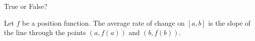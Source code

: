 \documentclass{ximera}
\author{Gregory Hartman \and Matthew Carr}
\begin{document}
\begin{exercise}




True or False?
\begin{center}
Let $f$ be a position function. The average rate of change on $[a,b]$ is the slope of the line through the points $\left(a,f(a)\right)$ and $\left(b,f(b)\right)$.
\end{center}

\begin{prompt}
\begin{multipleChoice}
\end{multipleChoice}
\end{prompt}


\end{exercise}
\end{document}
